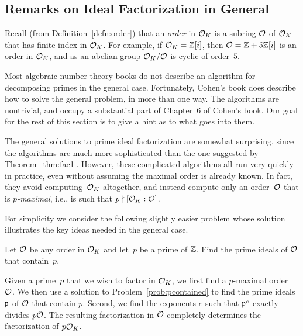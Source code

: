 \subsection{Remarks on Ideal Factorization in General}

Recall (from Definition~\ref{defn:order}) that an {\em order} in $\mathcal{O}_K$ is
a subring $\mathcal{O}$ of $\mathcal{O}_K$ that has finite index in $\mathcal{O}_K$.  For
example, if $\mathcal{O}_K = \mathbb{Z}[i]$, then $\mathcal{O} = \mathbb{Z} + 5\mathbb{Z}[i]$ is an order in $\mathcal{O}_K$,
and as an abelian group $\mathcal{O}_K/\mathcal{O}$ is cyclic of order~$5$.

Most algebraic number theory books do not describe an algorithm for
decomposing primes in the general case.  Fortunately, Cohen's book
\cite[Ch.~6]{cohen:course_ant} does describe how to solve the general
problem, in more than one way.  The algorithms are nontrivial, and
occupy a substantial part of Chapter~6 of Cohen's book.  Our goal
for the rest of this section is to give a hint as to what goes into them.

The general solutions to prime ideal factorization are somewhat surprising,
since the algorithms are much more sophisticated than the one
suggested by Theorem~\ref{thm:fac1}.  However, these complicated
algorithms all run very quickly in practice, even without assuming the
maximal order is already known.  In fact, they avoid computing~$\mathcal{O}_K$
altogether, and instead compute only an order~$\mathcal{O}$ that is {\em $p$-maximal},
i.e., is such that $p \nmid [\mathcal{O}_K:\mathcal{O}]$.

For simplicity we consider the following slightly easier problem whose
solution illustrates the key ideas needed in the general case.
\begin{problem}\label{prob:pcontained}
	Let $\mathcal{O}$ be any order in $\mathcal{O}_K$ and let~$p$ be a prime of $\mathbb{Z}$.
	Find the prime ideals of $\mathcal{O}$ that contain~$p$.
\end{problem}

Given a prime~$p$
that we wish to factor in $\mathcal{O}_K$, we first find a $p$-maximal order~$\mathcal{O}$.
We then use a solution to Problem~\ref{prob:pcontained} to find
the prime ideals $\mathfrak{p}$ of $\mathcal{O}$ that contain $p$.  Second, we find
the exponents $e$ such that $\mathfrak{p}^e$ exactly divides $p\mathcal{O}$.
The resulting factorization in $\mathcal{O}$ completely determines
the factorization of $p\mathcal{O}_K$.

